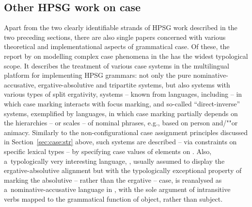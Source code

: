 \documentclass[output=paper,biblatex,babelshorthands,newtxmath,draftmode,colorlinks,citecolor=brown]{langscibook}
\begin{document}
\begin{exe}
\begin{xlist}
\begin{exe}
\begin{xlist}
\section{Other HPSG work on case}
\label{sec:case:other}

Apart from the two clearly identifiable strands of HPSG work described in the two preceding sections, there are also single papers concerned with various theoretical and implementational aspects of grammatical case.  Of these, the report by \citet{drel:08} on modelling complex case phenomena in the  \citep{BFO2002a-u} has the widest typological scope.  It describes the treatment of various case systems in the multilingual platform for implementing HPSG grammars: not only the pure nominative-accusative, ergative-absolutive and tripartite systems, but also systems with various types of split ergativity, systems – known from  languages, including  – in which case marking interacts with focus marking, and so-called “direct-inverse” systems, exemplified by  languages, in which case marking partially depends on the hierarchies – or scales – of nominal phrases, e.g., based on person and/""or animacy.  Similarly to the non-configurational case assignment principles discussed in Section~\ref{sec:case:str} above, such systems are described – via constraints on specific lexical types – by specifying case values of elements on .  Also, a~typologically very interesting language, , usually assumed to display the ergative-absolutive alignment but with the typologically exceptional property of marking the absolutive – rather than the ergative – case, is reanalysed as a~nominative-accusative language in \citet{Crysmann2009b-u}, with the sole argument of intransitive verbs mapped to the grammatical function of object, rather than subject.


\end{xlist}
\end{exe}
\end{xlist}
\end{exe}
\end{document}
